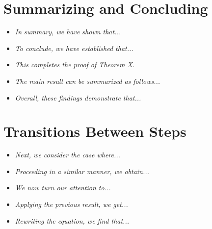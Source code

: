 \documentclass[10pt,letterpaper,oneside,reqno]{amsart}
\begin{document}
\begin{multicols}{2}
        \section*{Summarizing and Concluding}
        \begin{itemize}
            \item \textit{In summary, we have shown that...}
            \item \textit{To conclude, we have established that...}
            \item \textit{This completes the proof of Theorem X.}
            \item \textit{The main result can be summarized as follows...}
            \item \textit{Overall, these findings demonstrate that...}
        \end{itemize}

        \section*{Transitions Between Steps}
        \begin{itemize}
            \item \textit{Next, we consider the case where...}
            \item \textit{Proceeding in a similar manner, we obtain...}
            \item \textit{We now turn our attention to...}
            \item \textit{Applying the previous result, we get...}
            \item \textit{Rewriting the equation, we find that...}
        \end{itemize}

    \end{multicols}
\end{document}
